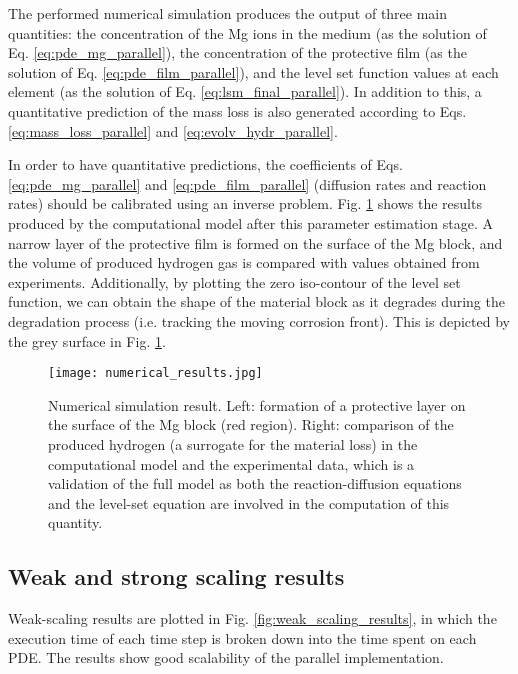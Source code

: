 The performed numerical simulation produces the output of three main quantities: the concentration of the Mg ions in the medium (as the solution of Eq. \ref{eq:pde_mg_parallel}), the concentration of the protective film (as the solution of Eq. \ref{eq:pde_film_parallel}), and the level set function values at each element (as the solution of Eq. \ref{eq:lsm_final_parallel}). In addition to this, a quantitative prediction of the mass loss is also generated according to Eqs. \ref{eq:mass_loss_parallel} and \ref{eq:evolv_hydr_parallel}.

In order to have quantitative predictions, the coefficients of Eqs. \ref{eq:pde_mg_parallel} and \ref{eq:pde_film_parallel} (diffusion rates and reaction rates) should be calibrated using an inverse problem. Fig. \ref{fig:numerical_results} shows the results produced by the computational model after this parameter estimation stage. A narrow layer of the protective film is formed on the surface of the Mg block, and the volume of produced hydrogen gas is compared with values obtained from experiments. Additionally, by plotting the zero iso-contour of the level set function, we can obtain the shape of the material block as it degrades during the degradation process (i.e. tracking the moving corrosion front). This is depicted by the grey surface in Fig. \ref{fig:numerical_results}.

\begin{figure}[h]
\centering
\medskip
\texttt{[image: numerical\_results.jpg]}
\caption[Numerical simulation result of the reaction-diffusion system]{Numerical simulation result. Left: formation of a protective layer on the surface of the Mg block (red region). Right: comparison of the produced hydrogen (a surrogate for the material loss) in the computational model and the experimental data, which is a validation of the full model as both the reaction-diffusion equations and the level-set equation are involved in the computation of this quantity.} \label{fig:numerical_results}
\end{figure}


\subsection{Weak and strong scaling results}

Weak-scaling results are plotted in Fig. \ref{fig:weak_scaling_results}, in which the execution time of each time step is broken down into the time spent on each \gls{PDE}. The results show good scalability of the parallel implementation.

